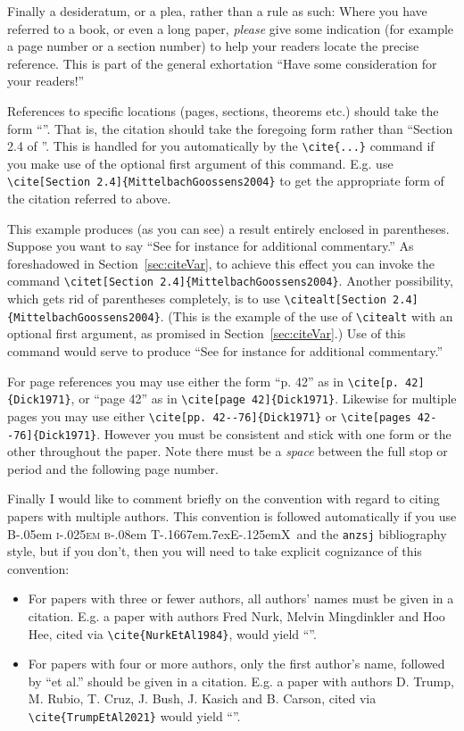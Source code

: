\documentclass[times, doublespace]{anzsauth}
\newcommand\BibTeX{{\rmfamily B\kern-.05em \textsc{i\kern-.025em b}\kern-.08em
T\kern-.1667em\lower.7ex\hbox{E}\kern-.125emX}}
\begin{document}
Finally a desideratum, or a plea, rather than a rule as such: Where
you have referred to a book, or even a long paper, \emph{please}
give some indication (for example a page number or a section number)
to help your readers locate the precise reference.  This is part of
the general exhortation ``Have some consideration for your readers!''

References to specific locations (pages, sections, theorems etc.)
should take the form ``\cite[Section 2.4]{MittelbachGoossens2004}''.
That is, the citation should take the foregoing form rather than
``Section 2.4 of \cite{MittelbachGoossens2004}''.  This is
handled for you automatically by the \verb!\cite{...}! command
if you make use of the optional first argument of this command.
E.g. use \verb!\cite[Section 2.4]{MittelbachGoossens2004}! to get
the appropriate form of the citation referred to above.

This example produces (as you can see) a result entirely enclosed
in parentheses.  Suppose you want to say ``See for instance
\citet[Section 2.4]{MittelbachGoossens2004} for additional
commentary.''  As foreshadowed in Section~\ref{sec:citeVar}, to
achieve this effect you can invoke the command
\verb!\citet[Section 2.4]{MittelbachGoossens2004}!.  Another
possibility, which gets rid of parentheses completely, is to use
\verb!\citealt[Section 2.4]{MittelbachGoossens2004}!.  (This is
the example of the use of \verb!\citealt! with an optional first
argument, as promised in Section~\ref{sec:citeVar}.)  Use of this
command would serve to produce ``See for instance \citealt[Section
2.4]{MittelbachGoossens2004} for additional commentary.''

For page references you may use either the form ``p. 42'' as in
\verb!\cite[p. 42]{Dick1971}!, or ``page 42'' as in
\verb!\cite[page 42]{Dick1971}!.  Likewise for multiple pages you may
use either \verb!\cite[pp. 42--76]{Dick1971}!
or \verb!\cite[pages 42--76]{Dick1971}!.
However you must be consistent and stick with one form or the
other throughout the paper.  Note there must be a \emph{space}
between the full stop or period and the following page number.

Finally I would like to comment briefly on the convention with
regard to citing papers with multiple authors.  This convention
is followed automatically if you use \BibTeX\ and the \texttt{anzsj}
bibliography style, but if you don't, then you will
need to take explicit cognizance of this convention:
\begin{itemize}
\item For papers with three or fewer authors, all authors' names
must be given in a citation.  E.g. a paper with authors Fred Nurk,
Melvin Mingdinkler and Hoo Hee, cited via \verb!\cite{NurkEtAl1984}!,
would yield ``\cite{NurkEtAl1984}''.
\item For papers with four or more authors, only the first
author's name, followed by ``et al.'' should be given in a citation.
E.g. a paper with authors D. Trump, M. Rubio, T. Cruz, J. Bush, J. Kasich
and B. Carson, cited via \verb!\cite{TrumpEtAl2021}! 
would yield ``\cite{TrumpEtAl2021}''. 
\end{itemize}
\end{document}
